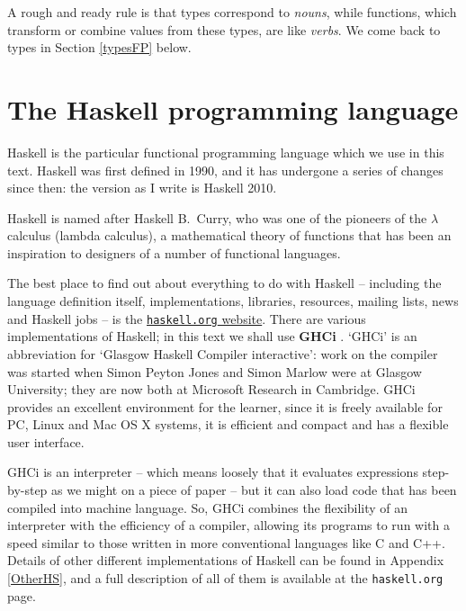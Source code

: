 A rough and ready rule is that types correspond to \emph{nouns}, while functions, which transform or combine values from these types, are like \emph{verbs}. We come back to types in Section
\ref{typesFP} below.


\section{The Haskell programming language}


Haskell \cite{haskell2010} is the particular functional programming language which
we use in this text. Haskell was first defined in 1990, and it has undergone a series of changes since then: the version as I write is Haskell 2010.

Haskell is named after Haskell B.\ Curry, who was one of the pioneers of
the $\lambda$ calculus (lambda calculus),
a mathematical theory of functions that has been an
inspiration to designers of a number of functional languages. 

The best place to find out about everything to do with Haskell -- including the language definition itself, implementations, libraries, resources, mailing lists, news and Haskell jobs -- is the \href{https://www.haskell.org/}{\texttt{haskell.org} website}.
There are various implementations of Haskell; in this 
text we shall use \textbf{GHCi} \citeyear{GHCi}. `GHCi' is an abbreviation for `Glasgow Haskell Compiler interactive': work on the compiler was started when Simon Peyton Jones and Simon Marlow were at Glasgow University; they are now both at Microsoft  Research in Cambridge.
GHCi provides an excellent environment for the learner, since it is freely
available for PC, Linux and Mac OS X systems, it is efficient and compact
and has a flexible user interface.

GHCi is an interpreter -- which means loosely that 
it evaluates expressions step-by-step as we might on a piece of paper -- but it can also load code that has been compiled into machine language. So, GHCi combines the flexibility of an interpreter with the efficiency of a compiler, 
allowing its programs to run with a speed similar to those
written in more conventional languages like C and C++. Details of other
different implementations of Haskell can be found in Appendix
\ref{OtherHS}, and a full description of all of them is available at the \texttt{haskell.org} page.


